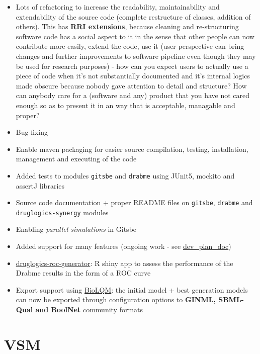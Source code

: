 \documentclass[12pt,]{book}
\providecommand{\tightlist}{%
  \setlength{\itemsep}{0pt}\setlength{\parskip}{0pt}}
\begin{document}
\begin{itemize}
\tightlist
\item
  Lots of refactoring to increase the readability, maintainability and
  extendability of the source code (complete restructure of classes, addition of
  others).
  This has \textbf{RRI extensions}, because cleaning and re-structuring software code has a social aspect to it in the sense that other people can now contribute more easily, extend the code, use it (user perspective can bring changes and further improvements to software pipeline even though they may be used for research purposes) - how can you expect users to actually use a piece of code when it's not substantially documented and it's internal logics made obscure because nobody gave attention to detail and structure? How can anybody care for a (software and any) product that you have not cared enough so as to present it in an way that is acceptable, managable and proper?
\item
  Bug fixing
\item
  Enable maven packaging for easier source compilation, testing,
  installation, management and executing of the code
\item
  Added tests to modules \texttt{gitsbe} and \texttt{drabme} using JUnit5, mockito and assertJ libraries
\item
  Source code documentation + proper README files on \texttt{gitsbe}, \texttt{drabme} and \texttt{druglogics-synergy} modules
\item
  Enabling \emph{parallel simulations} in Gitsbe
\item
  Added support for many features (ongoing work - see \href{https://docs.google.com/document/d/1OUupR0b-28YB9pVAww77RMecnFN6A39MYjXMjljmvG4/edit?usp=sharing}{dev\_plan\_doc})
\item
  \href{https://github.com/bblodfon/druglogics-roc-generator}{druglogics-roc-generator}:
  R shiny app to assess the performance of the Drabme results in the form of a
  ROC curve
\item
  Export support using \href{https://github.com/colomoto/bioLQM}{BioLQM}: the
  initial model + best generation models can now be exported through configuration
  options to \textbf{GINML, SBML-Qual and BoolNet} community formats
\end{itemize}

\hypertarget{vsm-dict}{%
\section{VSM}\label{vsm-dict}}
\end{document}
